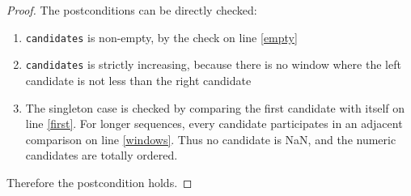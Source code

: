 \documentclass{article}
\begin{document}
\begin{proof}
    The postconditions can be directly checked:
    \begin{enumerate}
        \item \texttt{candidates} is non-empty, by the check on line \ref{empty}
        \item \texttt{candidates} is strictly increasing,
            because there is no window where the left candidate is not less than the right candidate
        \item The singleton case is checked by comparing the first candidate with itself on line \ref{first}.
            For longer sequences, every candidate participates in an adjacent comparison on line \ref{windows}.
            Thus no candidate is NaN, and the numeric candidates are totally ordered.
    \end{enumerate}
    Therefore the postcondition holds.
\end{proof}
\end{document}
